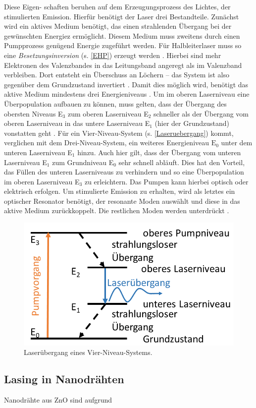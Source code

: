 Diese Eigen- schaften beruhen auf dem Erzeugungsprozess des Lichtes, der
stimulierten Emission. Hierfür benötigt der Laser drei Bestandteile. Zunächst
wird ein aktives Medium benötigt, das einen strahlenden Übergang bei der
gewünschten Energiez ermöglicht. Diesem Medium muss zweitens durch einen
Pumpprozess genügend Energie zugeführt werden. Für Halbleiterlaser muss so eine
\textit{Besetzungsinversion} (s. \autoref{EHP}) erzeugt werden
\cite{Kneubuhl.2008}. Hierbei sind mehr Elektronen des Valenzbandes in das
Leitungsband angeregt als im Valenzband verbleiben. Dort entsteht ein Überschuss
an Löchern – das System ist also gegenüber dem Grundzustand invertiert
\cite{Kneubuhl.2008}. Damit dies möglich wird, benötigt das aktive Medium
mindestens drei Energieniveaus \cite{Eichhorn.2013}. Um im oberen Laserniveau
eine Überpopulation aufbauen zu können, muss gelten, dass der Übergang des
obersten Niveaus E$_\text{3}$ zum oberen Laserniveau E$_\text{2}$ schneller  als
der Übergang vom oberen Laserniveau in das untere Laserniveau E$_\text{1}$ (hier
der Grundzustand) vonstatten geht \cite{Kneubuhl.2008}. Für ein
Vier-Niveau-System (s. \autoref{Laseruebergang}) kommt, verglichen mit dem
Drei-Niveau-System, ein weiteres Energieniveau $\text{E}_\text{0}$ unter dem
unteren Laserniveau E$_\text{1}$ hinzu. Auch hier gilt, dass der Übergang vom
unteren Laserniveau E$_\text{1}$ zum Grundniveau E$_\text{0}$ sehr schnell
abläuft. Dies hat den Vorteil, das Füllen des unteren Laserniveaus zu verhindern
und so eine Überpopulation im oberen Laserniveau E$_\text{3}$ zu erleichtern.
Das Pumpen kann hierbei optisch oder elektrisch erfolgen. Um stimulierte
Emission zu erhalten, wird als letztes ein optischer Resonator benötigt, der
resonante Moden auswählt und diese in das aktive Medium zurückkoppelt. Die
restlichen Moden werden unterdrückt \cite{Kneubuhl.2008}. \begin{figure}[h]
\includegraphics[width=.4\textwidth]{Bilder/Vorbetrachtung/Laseruebergang}
\caption{Laserübergang eines Vier-Niveau-Systems.} \label{Laseruebergang}
\end{figure} \subsection{Lasing in Nanodrähten} Nanodrähte aus ZnO sind aufgrund
